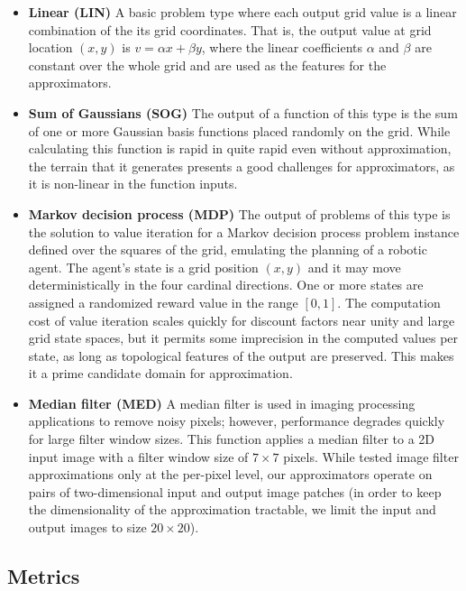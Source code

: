 \documentclass{article}
\begin{document}
\begin{itemize}
\item \textbf{Linear (LIN)} A basic problem type where each output grid value is a linear combination of the its grid coordinates. That is, the output value at grid location $(x, y)$ is $v = \alpha x + \beta y$, where the linear coefficients $\alpha$ and $\beta$ are constant over the whole grid and are used as the features for the approximators.

\item \textbf{Sum of Gaussians (SOG)} The output of a function of this type is the sum of one or more Gaussian basis functions placed randomly on the grid. While calculating this function is rapid in quite rapid even without approximation, the terrain that it generates presents a good challenges for approximators, as it is non-linear in the function inputs.

\item \textbf{Markov decision process (MDP)} The output of problems of this type is the solution to value iteration for a Markov decision process problem instance defined over the squares of the grid, emulating the planning of a robotic agent. The agent's state is a grid position $(x, y)$ and it may move deterministically in the four cardinal directions. One or more states are assigned a randomized reward value in the range $[0, 1]$. The computation cost of value iteration scales quickly for discount factors near unity and large grid state spaces, but it permits some imprecision in the computed values per state, as long as topological features of the output are preserved. This makes it a prime candidate domain for approximation.

\item \textbf{Median filter (MED)} A median filter is used in imaging processing applications to remove noisy pixels; however, performance degrades quickly for large filter window sizes. This function applies a median filter to a 2D input image with a filter window size of $7 \times 7$ pixels. While \cite{Esmaeilzadeh12} tested image filter approximations only at the per-pixel level, our approximators operate on pairs of two-dimensional input and output image patches (in order to keep the dimensionality of the approximation tractable, we limit the input and output images to size $20 \times 20$).
\end{itemize}

\subsection{Metrics}
\end{document}
